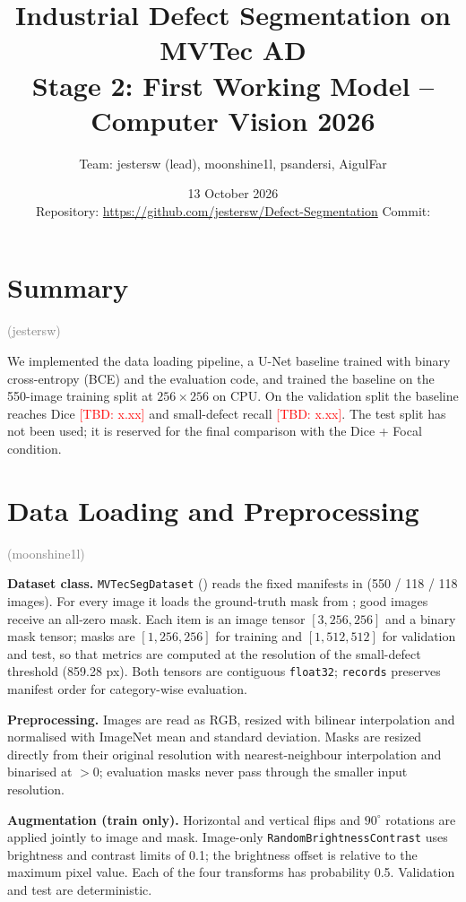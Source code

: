 \documentclass[11pt,a4paper]{article}
\title{\textbf{Industrial Defect Segmentation on MVTec AD}\\[2pt]\large Stage 2: First Working Model -- Computer Vision 2026}
\author{Team: jestersw (lead), moonshine1l, psandersi, AigulFar}
\date{13 October 2026\\[2pt]\small Repository: \url{https://github.com/jestersw/Defect-Segmentation} \quad Commit: \tbd{hash}}
\newcommand{\tbd}[1]{\textcolor{red}{[TBD: #1]}}
\newcommand{\owner}[1]{\textcolor{gray}{\small(#1)}}
\begin{document}
\maketitle
\vspace{-1.5em}

\section{Summary} \owner{jestersw}

We implemented the data loading pipeline, a U-Net baseline trained with binary cross-entropy (BCE) and the evaluation code, and trained the baseline on the 550-image training split at $256\times256$ on CPU. On the validation split the baseline reaches Dice \tbd{x.xx} and small-defect recall \tbd{x.xx}. The test split has not been used; it is reserved for the final comparison with the Dice + Focal condition.

\section{Data Loading and Preprocessing} \owner{moonshine1l}

\textbf{Dataset class.} \texttt{MVTecSegDataset} () reads the fixed manifests in  (550 / 118 / 118 images). For every image it loads the ground-truth mask from ; good images receive an all-zero mask. Each item is an image tensor $[3,256,256]$ and a binary mask tensor; masks are $[1,256,256]$ for training and $[1,512,512]$ for validation and test, so that metrics are computed at the resolution of the small-defect threshold (859.28 px). Both tensors are contiguous \texttt{float32}; \texttt{records} preserves manifest order for category-wise evaluation.

\textbf{Preprocessing.} Images are read as RGB, resized with bilinear interpolation and normalised with ImageNet mean and standard deviation. Masks are resized directly from their original resolution with nearest-neighbour interpolation and binarised at $>0$; evaluation masks never pass through the smaller input resolution.

\textbf{Augmentation (train only).} Horizontal and vertical flips and $90^\circ$ rotations are applied jointly to image and mask. Image-only \texttt{RandomBrightnessContrast} uses brightness and contrast limits of 0.1; the brightness offset is relative to the maximum pixel value. Each of the four transforms has probability 0.5. Validation and test are deterministic.
\end{document}
